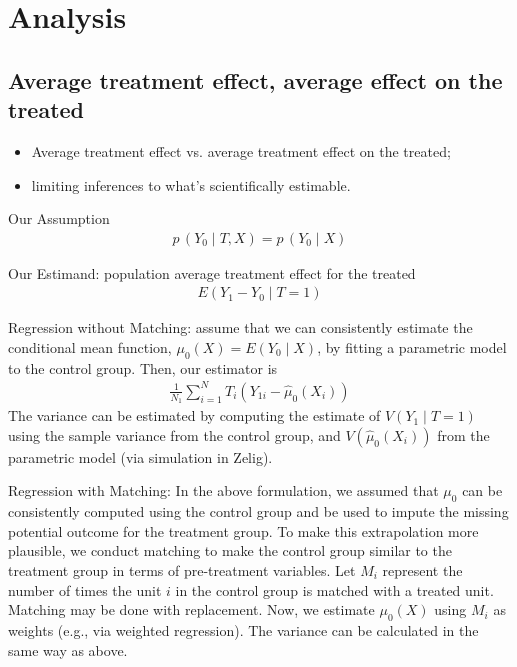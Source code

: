 \documentclass[11pt,titlepage]{article}
\begin{document}
\section{Analysis}
\label{analysis}
\subsection{Average treatment effect, average effect on the treated}

\begin{itemize} 
\item Average treatment effect vs. average
  treatment effect on the treated; 
\item limiting inferences to what's
  scientifically estimable. 
\end{itemize}

Our Assumption
\begin{eqnarray}
  p\,(Y_0 \mid T,  X) = p\,(Y_0 \mid X)
\end{eqnarray}

Our Estimand: population average treatment effect for the treated
\begin{eqnarray}
  E(Y_1 - Y_0 \mid T=1)
\end{eqnarray}

Regression without Matching: assume that we can consistently estimate
the conditional mean function, $\mu_{0}(X)= E(Y_0 \mid X)$, by fitting
a parametric model to the control group.  Then, our estimator is
\begin{eqnarray}
    \frac{1}{N_1} \sum_{i=1}^{N} T_i (Y_{1i} - \hat{\mu}_0(X_i))
\end{eqnarray}
The variance can be estimated by computing the estimate of $V(Y_1 \mid
T=1)$ using the sample variance from the control group, and
$V(\hat{\mu}_0(X_i))$ from the parametric model (via simulation in
Zelig).

Regression with Matching: In the above formulation, we assumed that
$\mu_{0}$ can be consistently computed using the control group and be
used to impute the missing potential outcome for the treatment group.
To make this extrapolation more plausible, we conduct matching to make
the control group similar to the treatment group in terms of
pre-treatment variables. Let $M_i$ represent the number of times the
unit $i$ in the control group is matched with a treated unit.
Matching may be done with replacement.  Now, we estimate $\mu_{0}(X)$
using $M_i$ as weights (e.g., via weighted regression). The variance
can be calculated in the same way as above.
\end{document}
